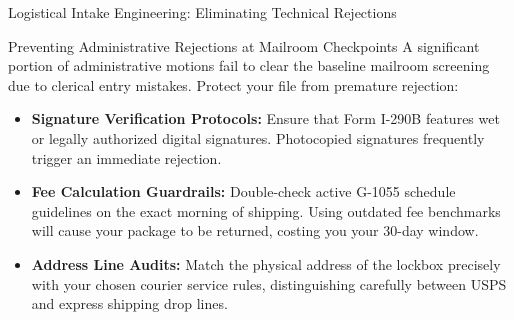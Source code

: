 \documentclass[11pt]{beamer}
\begin{document}
	\begin{frame}{Logistical Intake Engineering: Eliminating Technical Rejections}
		\scriptsize
		\begin{block}{Preventing Administrative Rejections at Mailroom Checkpoints}
			A significant portion of administrative motions fail to clear the baseline mailroom screening due to clerical entry mistakes. Protect your file from premature rejection:
			\begin{itemize}
				\item \textbf{Signature Verification Protocols:} Ensure that Form I-290B features wet or legally authorized digital signatures. Photocopied signatures frequently trigger an immediate rejection.
				\item \textbf{Fee Calculation Guardrails:} Double-check active G-1055 schedule guidelines on the exact morning of shipping. Using outdated fee benchmarks will cause your package to be returned, costing you your 30-day window.
				\item \textbf{Address Line Audits:} Match the physical address of the lockbox precisely with your chosen courier service rules, distinguishing carefully between USPS and express shipping drop lines.
			\end{itemize}
		\end{block}
	\end{frame}
	
\end{document}
